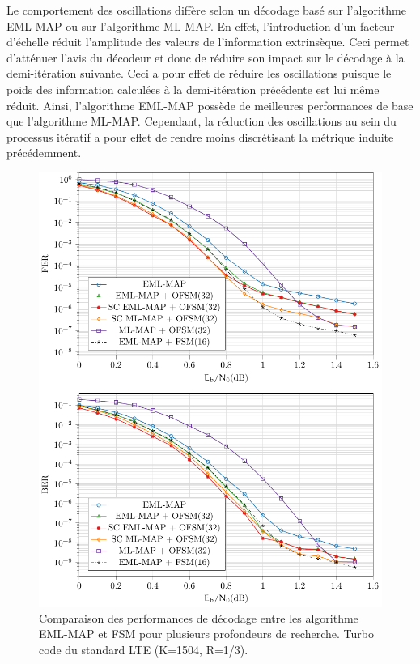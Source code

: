 Le comportement des oscillations diffère selon un décodage basé sur l'algorithme EML-MAP ou sur l'algorithme ML-MAP. En effet, 
l'introduction d'un facteur d'échelle réduit l'amplitude des valeurs de l'information extrinsèque. Ceci permet d'atténuer 
l'avis du décodeur et donc de réduire son impact sur le décodage à la demi-itération suivante. Ceci a pour effet de 
réduire les oscillations puisque le poids des information calculées à la demi-itération précédente est lui même réduit. 
Ainsi, l'algorithme EML-MAP possède de meilleures performances de base que l'algorithme ML-MAP. Cependant, la réduction 
des oscillations au sein du processus itératif a pour effet de rendre moins discrétisant la métrique induite 
précédemment.

\begin{figure}[!h]
	\centering
	\includegraphics[width=.8\textwidth]{main/ch2_fig/tikz/redec_osc.pdf}
	\vspace*{.3cm}
	\caption{\label{fig:osc}Comparaison des performances de décodage entre les algorithme EML-MAP et FSM pour plusieurs 
	profondeurs de recherche. Turbo code du standard LTE (K=1504, R=1/3).}
\end{figure}

